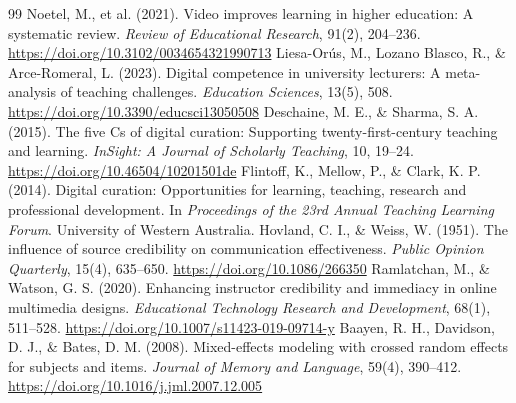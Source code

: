\documentclass[11pt]{ltjarticle}
\begin{document}
\begin{thebibliography}{99}\small
{}
Noetel, M., et al. (2021). Video improves learning in higher education: A systematic review. \textit{Review of Educational Research}, 91(2), 204--236. \url{https://doi.org/10.3102/0034654321990713}
Liesa-Or\'us, M., Lozano Blasco, R., \& Arce-Romeral, L. (2023). Digital competence in university lecturers: A meta-analysis of teaching challenges. \textit{Education Sciences}, 13(5), 508. \url{https://doi.org/10.3390/educsci13050508}
Deschaine, M. E., \& Sharma, S. A. (2015). The five Cs of digital curation: Supporting twenty-first-century teaching and learning. \textit{InSight: A Journal of Scholarly Teaching}, 10, 19--24. \url{https://doi.org/10.46504/10201501de}
Flintoff, K., Mellow, P., \& Clark, K. P. (2014). Digital curation: Opportunities for learning, teaching, research and professional development. In \textit{Proceedings of the 23rd Annual Teaching Learning Forum}. University of Western Australia.
Hovland, C. I., \& Weiss, W. (1951). The influence of source credibility on communication effectiveness. \textit{Public Opinion Quarterly}, 15(4), 635--650. \url{https://doi.org/10.1086/266350}
Ramlatchan, M., \& Watson, G. S. (2020). Enhancing instructor credibility and immediacy in online multimedia designs. \textit{Educational Technology Research and Development}, 68(1), 511--528. \url{https://doi.org/10.1007/s11423-019-09714-y}
Baayen, R. H., Davidson, D. J., \& Bates, D. M. (2008). Mixed-effects modeling with crossed random effects for subjects and items. \textit{Journal of Memory and Language}, 59(4), 390--412. \url{https://doi.org/10.1016/j.jml.2007.12.005}
\end{thebibliography}
\end{document}
